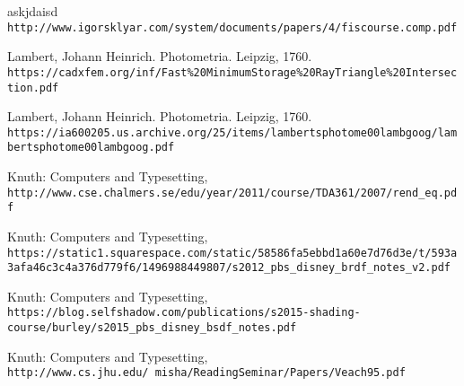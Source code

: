 \begin{thebibliography}{9}


	askjdaisd
	\\\texttt{http://www.igorsklyar.com/system/documents/papers/4/fiscourse.comp.pdf}

	Lambert, Johann Heinrich. Photometria. Leipzig, 1760.
	\\\texttt{https://cadxfem.org/inf/Fast\%20MinimumStorage\%20RayTriangle\%20Intersection.pdf}


	
	
	Lambert, Johann Heinrich. Photometria. Leipzig, 1760.
	\\\texttt{https://ia600205.us.archive.org/25/items/lambertsphotome00lambgoog/lambertsphotome00lambgoog.pdf}

	Knuth: Computers and Typesetting,
	\\\texttt{http://www.cse.chalmers.se/edu/year/2011/course/TDA361/2007/rend\_eq.pdf}
	
	Knuth: Computers and Typesetting,
	\\\texttt{https://static1.squarespace.com/static/58586fa5ebbd1a60e7d76d3e/t/593a3afa46c3c4a376d779f6/1496988449807/s2012\_pbs\_disney\_brdf\_notes\_v2.pdf}
	
	Knuth: Computers and Typesetting,
	\\\texttt{https://blog.selfshadow.com/publications/s2015-shading-course/burley/s2015\_pbs\_disney\_bsdf\_notes.pdf}
	
	Knuth: Computers and Typesetting,
	\\\texttt{http://www.cs.jhu.edu/~misha/ReadingSeminar/Papers/Veach95.pdf}
	
\end{thebibliography}











